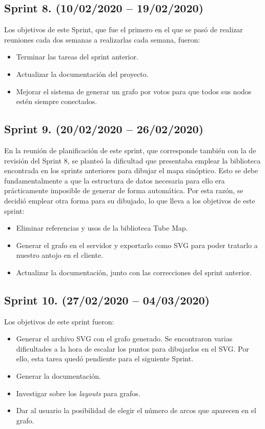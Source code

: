 \subsection{Sprint 8. (10/02/2020 -- 19/02/2020)}
Los objetivos de este Sprint, que fue el primero en el que se pasó de realizar reuniones cada dos semanas a realizarlas cada semana, fueron:
\begin{itemize}
	\item Terminar las tareas del sprint anterior.
	\item Actualizar la documentación del proyecto.
	\item Mejorar el sistema de generar un grafo por votos para que todos sus nodos estén siempre conectados.
\end{itemize}

\subsection{Sprint 9. (20/02/2020 -- 26/02/2020)}
En la reunión de planificación de este sprint, que corresponde también con la de revisión del Sprint 8, se planteó la dificultad que presentaba emplear la biblioteca encontrada en los sprints anteriores para dibujar el mapa sinóptico. Esto se debe fundamentalmente a que la estructura de datos necesaria para ello era prácticamente imposible de generar de forma automática.
Por esta razón, se decidió emplear otra forma para su dibujado, lo que lleva a los objetivos de este sprint:
\begin{itemize}
	\item Eliminar referencias y usos de la biblioteca Tube Map.
	\item Generar el grafo en el servidor y exportarlo como SVG para poder tratarlo a nuestro antojo en el cliente.
	\item Actualizar la documentación, junto con las correcciones del sprint anterior.
\end{itemize}

\subsection{Sprint 10. (27/02/2020 -- 04/03/2020)}
Los objetivos de este sprint fueron:
\begin{itemize}
	\item Generar el archivo SVG con el grafo generado. Se encontraron varias dificultades a la hora de escalar los puntos para dibujarlos en el SVG. Por ello, esta tarea quedó pendiente para el siguiente Sprint.
	\item Generar la documentación.
	\item Investigar sobre los \textit{layouts} para grafos.
	\item Dar al usuario la posibilidad de elegir el número de arcos que aparecen en el grafo.
\end{itemize}

